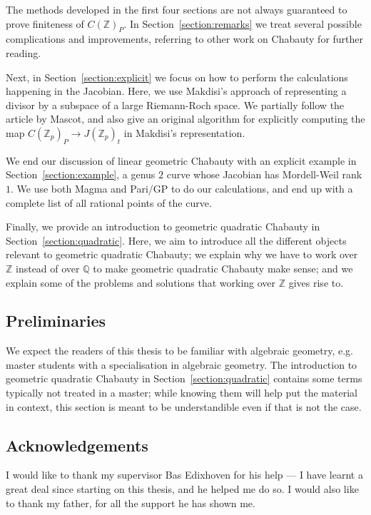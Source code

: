 \documentclass[12pt]{article}
\newcommand{\Z}{\mathbb{Z}}
\newcommand{\Q}{\mathbb{Q}}
\theoremstyle{plain}
\theoremstyle{definition}
\theoremstyle{remark}
\begin{document}
The methods developed in the first four sections are not always guaranteed to prove finiteness of $C(\Z)_P$. In Section~\ref{section:remarks} we treat several possible complications and improvements, referring to other work on Chabauty for further reading.

Next, in Section~\ref{section:explicit} we focus on how to perform the calculations happening in the Jacobian. Here, we use Makdisi's approach of representing a divisor by a subspace of a large Riemann-Roch space. We partially follow the article \cite{mascot18} by Mascot, and also give an original algorithm for explicitly computing the map $C(\Z_p)_P \to J(\Z_p)_t$ in Makdisi's representation.

We end our discussion of linear geometric Chabauty with an explicit example in Section~\ref{section:example}, a genus $2$ curve whose Jacobian has Mordell-Weil rank $1$. We use both Magma and Pari/GP to do our calculations, and end up with a complete list of all rational points of the curve.

Finally, we provide an introduction to geometric quadratic Chabauty in Section~\ref{section:quadratic}. Here, we aim to introduce all the different objects relevant to geometric quadratic Chabauty; we explain why we have to work over $\Z$ instead of over $\Q$ to make geometric quadratic Chabauty make sense; and we explain some of the problems and solutions that working over $\Z$ gives rise to.

\subsection{Preliminaries}
We expect the readers of this thesis to be familiar with algebraic geometry, e.g. master students with a specialisation in algebraic geometry. The introduction to geometric quadratic Chabauty in Section~\ref{section:quadratic} contains some terms typically not treated in a master; while knowing them will help put the material in context, this section is meant to be understandible even if that is not the case.

\subsection{Acknowledgements}
I would like to thank my supervisor Bas Edixhoven for his help --- I have learnt a great deal since starting on this thesis, and he helped me do so. I would also like to thank my father, for all the support he has shown me.
\end{document}
